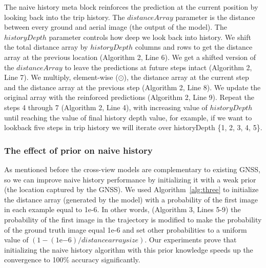 \documentclass[10pt,letterpaper]{article}
\begin{document}
The naive history meta block reinforces the prediction at the current position by looking back into the trip history. The $distanceArray$ parameter is the distance between every ground and aerial image (the output of the model).  The $historyDepth$ parameter controls how deep we look back into history. We shift the total distance array by $historyDepth$ columns and rows to get the distance array at the previous location (Algorithm 2, Line 6). We get a shifted version of the $distanceArray$ to leave the predictions at future steps intact (Algorithm 2, Line 7).  We multiply, element-wise ($\odot$), the distance array at the current step and the distance array at the previous step (Algorithm 2, Line 8). We update the original array with the reinforced predictions (Algorithm 2, Line 9). Repeat the steps 4 through 7 (Algorithm 2, Line 4), with increasing value of $historyDepth$ until reaching the value of final history depth value, for example, if we want to lookback five steps in trip history we will iterate over historyDepth  \{1, 2, 3, 4, 5\}.

\subsubsection*{The effect of prior on naive history}
As mentioned before the cross-view models are complementary to existing GNSS, so we can improve naive history performance by initializing it with a weak prior (the location captured by the GNSS).  We used Algorithm~\ref{alg:three} to initialize the distance array (generated by the model) with a probability of the first image in each example equal to 1e-6. In other words, (Algorithm 3, Lines 5-9) the probability of the first image in the trajectory is modified to make the probability of the ground truth image equal 1e-6 and set other probabilities to a uniform value of $(1 - (1\mathrm{e}{-6}) / distance array size)$. Our experiments prove that initializing the naive history algorithm with this prior knowledge speeds up the convergence to 100\% accuracy significantly.
\end{document}
